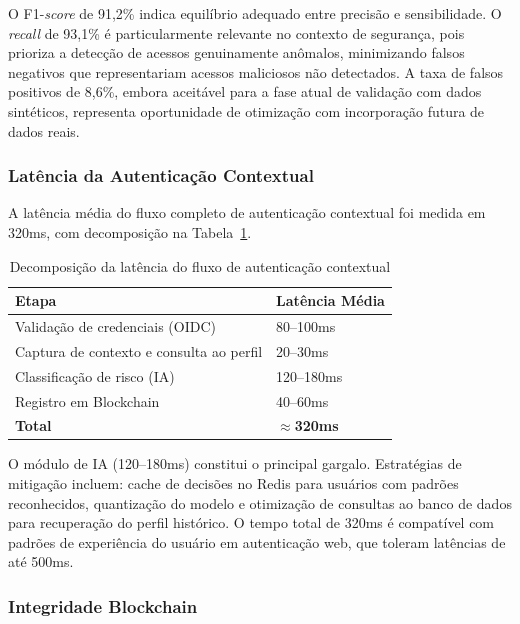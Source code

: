 \documentclass[12pt]{article}
\begin{document}
O F1-\textit{score} de 91,2\% indica equilíbrio adequado entre precisão e sensibilidade. O \textit{recall} de 93,1\% é particularmente relevante no contexto de segurança, pois prioriza a detecção de acessos genuinamente anômalos, minimizando falsos negativos que representariam acessos maliciosos não detectados. A taxa de falsos positivos de 8,6\%, embora aceitável para a fase atual de validação com dados sintéticos, representa oportunidade de otimização com incorporação futura de dados reais.

\subsubsection{Latência da Autenticação Contextual}

A latência média do fluxo completo de autenticação contextual foi medida em 320ms, com decomposição na Tabela~\ref{tab:latency}.

\begin{table}[H]
\centering
\caption{Decomposição da latência do fluxo de autenticação contextual}
\label{tab:latency}
\small
\begin{tabular}{@{}ll@{}}
\toprule
\textbf{Etapa} & \textbf{Latência Média} \\
\midrule
Validação de credenciais (OIDC)          & 80--100ms \\
Captura de contexto e consulta ao perfil & 20--30ms \\
Classificação de risco (IA)              & 120--180ms \\
Registro em Blockchain                   & 40--60ms \\
\midrule
\textbf{Total}                           & \textbf{$\approx$320ms} \\
\bottomrule
\end{tabular}
\end{table}

O módulo de IA (120--180ms) constitui o principal gargalo. Estratégias de mitigação incluem: cache de decisões no Redis para usuários com padrões reconhecidos, quantização do modelo e otimização de consultas ao banco de dados para recuperação do perfil histórico. O tempo total de 320ms é compatível com padrões de experiência do usuário em autenticação web, que toleram latências de até 500ms.

\subsubsection{Integridade Blockchain}
\end{document}

